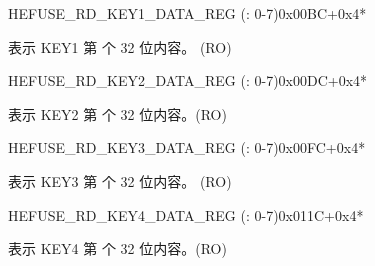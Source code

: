 \begin{register}{H}{EFUSE\_RD\_KEY1\_DATA\_REG (: 0-7)}{0x00BC+0x4*}\label{regdesc:EFUSERDKEY1DATANREG}
%
\regnewline%
\begin{regdesc}\begin{reglist}
\label{fielddesc:EFUSEKEY1DATAN}\item [EFUSE\_KEY1\_DATA\regindex{n}] 表示 KEY1 第  个 32 位内容。 (RO)
\end{reglist}\end{regdesc}
\end{register}


\begin{register}{H}{EFUSE\_RD\_KEY2\_DATA\_REG (: 0-7)}{0x00DC+0x4*}\label{regdesc:EFUSERDKEY2DATANREG}
%
\regnewline%
\begin{regdesc}\begin{reglist}
\label{fielddesc:EFUSEKEY2DATAN}\item [EFUSE\_KEY2\_DATA\regindex{n}] 表示 KEY2 第  个 32 位内容。(RO)
\end{reglist}\end{regdesc}
\end{register}


\begin{register}{H}{EFUSE\_RD\_KEY3\_DATA\_REG (: 0-7)}{0x00FC+0x4*}\label{regdesc:EFUSERDKEY3DATANREG}
%
\regnewline%
\begin{regdesc}\begin{reglist}
\label{fielddesc:EFUSEKEY3DATAN}\item [EFUSE\_KEY3\_DATA\regindex{n}] 表示 KEY3 第  个 32 位内容。 (RO)
\end{reglist}\end{regdesc}
\end{register}


\begin{register}{H}{EFUSE\_RD\_KEY4\_DATA\_REG (: 0-7)}{0x011C+0x4*}\label{regdesc:EFUSERDKEY4DATANREG}
%
\regnewline%
\begin{regdesc}\begin{reglist}
\label{fielddesc:EFUSEKEY4DATAN}\item [EFUSE\_KEY4\_DATA\regindex{n}] 表示 KEY4 第  个 32 位内容。(RO)
\end{reglist}\end{regdesc}
\end{register}


